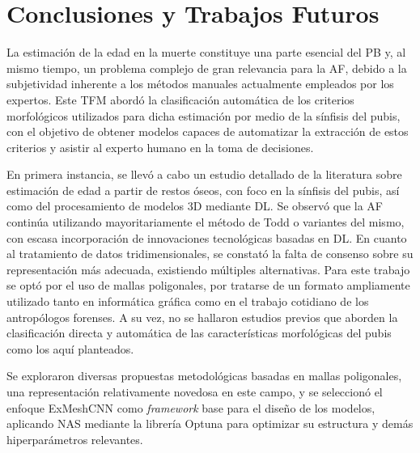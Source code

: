 \chapter{Conclusiones y Trabajos Futuros}

La estimación de la edad en la muerte constituye una parte esencial del PB y, al mismo tiempo, un problema complejo de gran relevancia para la AF, debido a la subjetividad inherente a los métodos manuales actualmente empleados por los expertos. Este TFM abordó la clasificación automática de los criterios morfológicos utilizados para dicha estimación por medio de la sínfisis del pubis, con el objetivo de obtener modelos capaces de automatizar la extracción de estos criterios y asistir al experto humano en la toma de decisiones.

En primera instancia, se llevó a cabo un estudio detallado de la literatura sobre estimación de edad a partir de restos óseos, con foco en la sínfisis del pubis, así como del procesamiento de modelos 3D mediante DL. Se observó que la AF continúa utilizando mayoritariamente el método de Todd \cite{RefWorks:RefID:19-todd1921age} o variantes del mismo, con escasa incorporación de innovaciones tecnológicas basadas en DL. En cuanto al tratamiento de datos tridimensionales, se constató la falta de consenso sobre su representación más adecuada, existiendo múltiples alternativas. Para este trabajo se optó por el uso de mallas poligonales, por tratarse de un formato ampliamente utilizado tanto en informática gráfica como en el trabajo cotidiano de los antropólogos forenses. A su vez, no se hallaron estudios previos que aborden la clasificación directa y automática de las características morfológicas del pubis como los aquí planteados.

Se exploraron diversas propuestas metodológicas basadas en mallas poligonales, una representación relativamente novedosa en este campo, y se seleccionó el enfoque ExMeshCNN como \textit{framework} base para el diseño de los modelos, aplicando NAS mediante la librería Optuna \cite{optuna_2019} para optimizar su estructura y demás hiperparámetros relevantes.

